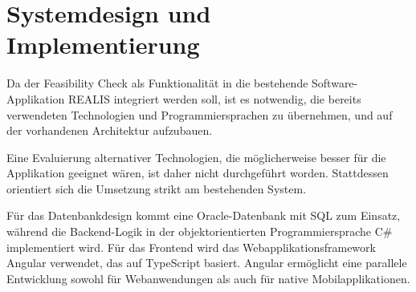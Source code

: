 \chapter{Systemdesign und Implementierung}\label{Chap:systemdesign-implementation}

Da der Feasibility Check als Funktionalität in die bestehende Software-Applikation \gls{REALIS} integriert werden soll, ist es notwendig, die bereits verwendeten Technologien und Programmiersprachen zu übernehmen, und auf der vorhandenen Architektur aufzubauen.

Eine Evaluierung alternativer Technologien, die möglicherweise besser für die Applikation geeignet wären, ist daher nicht durchgeführt worden. Stattdessen orientiert sich die Umsetzung strikt am bestehenden System.

Für das Datenbankdesign kommt eine Oracle-Datenbank mit SQL zum Einsatz, während die Backend-Logik in der objektorientierten Programmiersprache C\# implementiert wird. Für das Frontend wird das Webapplikationsframework Angular verwendet, das auf TypeScript basiert. Angular ermöglicht eine parallele Entwicklung sowohl für Web\-anwendungen als auch für native Mobilapplikationen.












